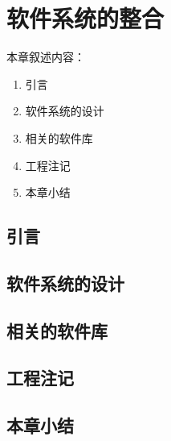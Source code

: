 \chapter{软件系统的整合}
\label{chap9}

本章叙述内容：
\begin{enumerate}
  \item 引言
  \item 软件系统的设计
  \item 相关的软件库
  \item 工程注记
  \item 本章小结
\end{enumerate}

\section{引言}

\section{软件系统的设计}

\section{相关的软件库}

\section{工程注记}

\section{本章小结}